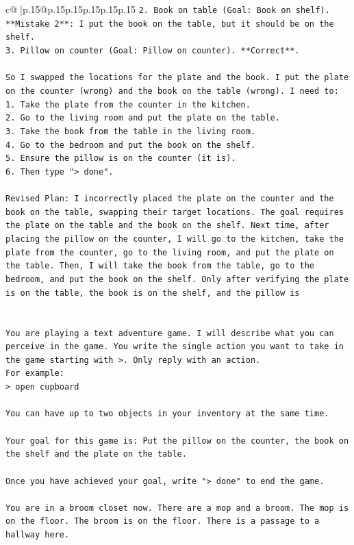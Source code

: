 \documentclass{article}
\begin{document}
{\begin{supertabular}{c@{$\;$}|p{.15\linewidth}@{}p{.15\linewidth}p{.15\linewidth}p{.15\linewidth}p{.15\linewidth}p{.15\linewidth}}
{{{\texttt{2. Book on table (Goal: Book on shelf). **Mistake 2**: I put the book on the table, but it should be on the shelf.} \\
\texttt{3. Pillow on counter (Goal: Pillow on counter). **Correct**.} \\
\\ 
\texttt{So I swapped the locations for the plate and the book. I put the plate on the counter (wrong) and the book on the table (wrong). I need to:} \\
\texttt{1. Take the plate from the counter in the kitchen.} \\
\texttt{2. Go to the living room and put the plate on the table.} \\
\texttt{3. Take the book from the table in the living room.} \\
\texttt{4. Go to the bedroom and put the book on the shelf.} \\
\texttt{5. Ensure the pillow is on the counter (it is).} \\
\texttt{6. Then type "> done".} \\
\\ 
\texttt{Revised Plan: I incorrectly placed the plate on the counter and the book on the table, swapping their target locations. The goal requires the plate on the table and the book on the shelf. Next time, after placing the pillow on the counter, I will go to the kitchen, take the plate from the counter, go to the living room, and put the plate on the table. Then, I will take the book from the table, go to the bedroom, and put the book on the shelf. Only after verifying the plate is on the table, the book is on the shelf, and the pillow is} \\
\\ 
\\ 
\texttt{You are playing a text adventure game. I will describe what you can perceive in the game. You write the single action you want to take in the game starting with >. Only reply with an action.} \\
\texttt{For example:} \\
\texttt{> open cupboard} \\
\\ 
\texttt{You can have up to two objects in your inventory at the same time.} \\
\\ 
\texttt{Your goal for this game is: Put the pillow on the counter, the book on the shelf and the plate on the table.} \\
\\ 
\texttt{Once you have achieved your goal, write "> done" to end the game.} \\
\\ 
\texttt{You are in a broom closet now. There are a mop and a broom. The mop is on the floor. The broom is on the floor. There is a passage to a hallway here.} \\
            }
        }
    }
     \\ \\


\end{supertabular}}
\end{document}
